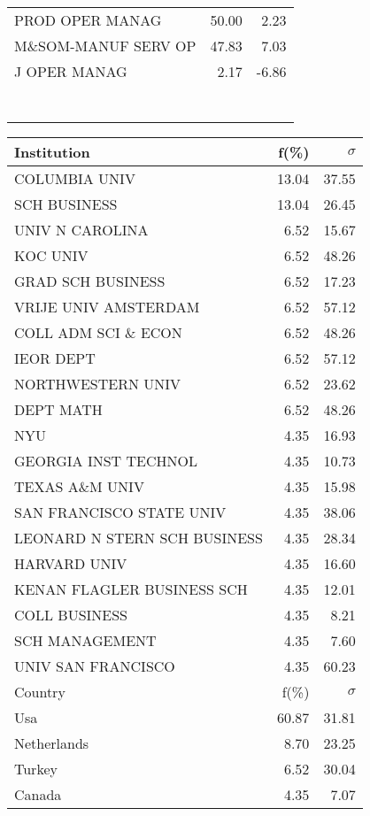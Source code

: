\documentclass[a4paper,11pt]{report}
\begin{document}
\begin{landscape}
\begin{table}[!ht]
{\begin{tabular}{|l r r|}
\hline
PROD OPER MANAG & 50.00 & 2.23\\
M\&SOM-MANUF SERV OP & 47.83 & 7.03\\
J OPER MANAG & 2.17 & -6.86\\
 &  & \\
 &  & \\
 &  & \\
 &  & \\
 &  & \\
 &  & \\
 &  & \\
\hline
\end{tabular}
}
{\scriptsize\begin{tabular}{|l r r|}
\hline
Institution & f(\%) & $\sigma$\\
\hline
COLUMBIA UNIV & 13.04 & 37.55\\
SCH BUSINESS & 13.04 & 26.45\\
UNIV N CAROLINA & 6.52 & 15.67\\
KOC UNIV & 6.52 & 48.26\\
GRAD SCH BUSINESS & 6.52 & 17.23\\
VRIJE UNIV AMSTERDAM & 6.52 & 57.12\\
COLL ADM SCI \& ECON & 6.52 & 48.26\\
IEOR DEPT & 6.52 & 57.12\\
NORTHWESTERN UNIV & 6.52 & 23.62\\
DEPT MATH & 6.52 & 48.26\\
NYU & 4.35 & 16.93\\
GEORGIA INST TECHNOL & 4.35 & 10.73\\
TEXAS A\&M UNIV & 4.35 & 15.98\\
SAN FRANCISCO STATE UNIV & 4.35 & 38.06\\
LEONARD N STERN SCH BUSINESS & 4.35 & 28.34\\
HARVARD UNIV & 4.35 & 16.60\\
KENAN FLAGLER BUSINESS SCH & 4.35 & 12.01\\
COLL BUSINESS & 4.35 & 8.21\\
SCH MANAGEMENT & 4.35 & 7.60\\
UNIV SAN FRANCISCO & 4.35 & 60.23\\
\hline
\hline
Country & f(\%) & $\sigma$\\
\hline
Usa & 60.87 & 31.81\\
Netherlands & 8.70 & 23.25\\
Turkey & 6.52 & 30.04\\
Canada & 4.35 & 7.07\\

\end{tabular}}
\end{table}
\end{landscape}
\end{document}
